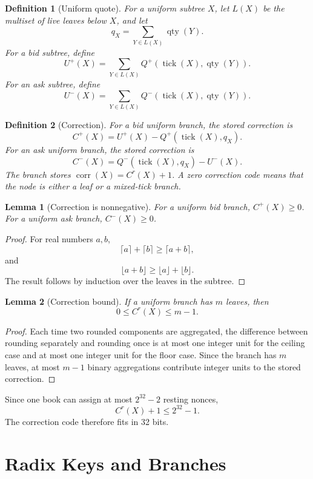 \documentclass[11pt]{article}
\newtheorem{definition}{Definition}
\newtheorem{lemma}{Lemma}
\DeclareMathOperator{\tick}{tick}
\DeclareMathOperator{\qty}{qty}
\DeclareMathOperator{\corr}{corr}
\begin{document}
\begin{definition}[Uniform quote]
For a uniform subtree \(X\), let \(L(X)\) be the multiset of live leaves
below \(X\), and let
\[
  q_X=\sum_{Y\in L(X)}\qty(Y).
\]
For a bid subtree, define
\[
  U^{+}(X)=\sum_{Y\in L(X)} Q^{+}(\tick(X),\qty(Y)).
\]
For an ask subtree, define
\[
  U^{-}(X)=\sum_{Y\in L(X)} Q^{-}(\tick(X),\qty(Y)).
\]
\end{definition}

\begin{definition}[Correction]
For a bid uniform branch, the stored correction is
\[
  C^{+}(X)=U^{+}(X)-Q^{+}(\tick(X),q_X).
\]
For an ask uniform branch, the stored correction is
\[
  C^{-}(X)=Q^{-}(\tick(X),q_X)-U^{-}(X).
\]
The branch stores \(\corr(X)=C^{r}(X)+1\).  A zero correction code means
that the node is either a leaf or a mixed-tick branch.
\end{definition}

\begin{lemma}[Correction is nonnegative]
For a uniform bid branch, \(C^{+}(X)\ge 0\).  For a uniform ask branch,
\(C^{-}(X)\ge 0\).
\end{lemma}

\begin{proof}
For real numbers \(a,b\),
\[
  \lceil a\rceil+\lceil b\rceil \ge \lceil a+b\rceil,
\]
and
\[
  \lfloor a+b\rfloor \ge \lfloor a\rfloor+\lfloor b\rfloor .
\]
The result follows by induction over the leaves in the subtree.
\end{proof}

\begin{lemma}[Correction bound]
If a uniform branch has \(m\) leaves, then
\[
  0\le C^{r}(X)\le m-1.
\]
\end{lemma}

\begin{proof}
Each time two rounded components are aggregated, the difference between
rounding separately and rounding once is at most one integer unit for
the ceiling case and at most one integer unit for the floor case.  Since the
branch has \(m\) leaves, at most \(m-1\) binary aggregations contribute
integer units to the stored correction.
\end{proof}

Since one book can assign at most \(2^{32}-2\) resting nonces,
\[
  C^{r}(X)+1 \le 2^{32}-1.
\]
The correction code therefore fits in 32 bits.

\section{Radix Keys and Branches}
\end{document}
